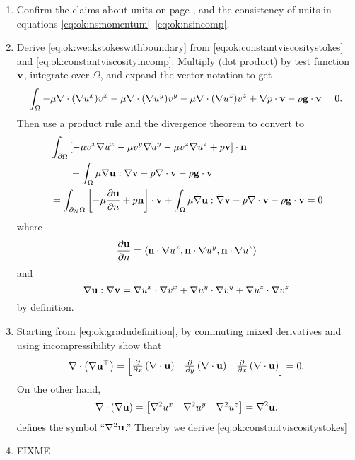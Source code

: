 \renewcommand{\labelenumi}{\arabic{chapter}.\arabic{enumi}\quad}
\begin{enumerate}
\item Confirm the claims about units on page \pageref{page:ok:units}, and the consistency of units in equations \eqref{eq:ok:nsmomentum}--\eqref{eq:ok:nsincomp}.

\item \label{exer:ok:weakderive} Derive \eqref{eq:ok:weakstokeswithboundary} from \eqref{eq:ok:constantviscositystokes} and \eqref{eq:ok:constantviscosityincomp}:  Multiply (dot product) by test function $\mathbf{v}$, integrate over $\Omega$, and expand the vector notation to get
    $$\int_\Omega - \mu \nabla\cdot (\nabla u^x) v^x - \mu \nabla\cdot (\nabla u^y) v^y - \mu \nabla\cdot (\nabla u^z) v^z + \nabla p \cdot \mathbf{v} - \rho \mathbf{g} \cdot \mathbf{v} = 0.$$
Then use a product rule and the divergence theorem to convert to
\begin{align*}
   &\int_{\partial \Omega} \left[- \mu v^x \nabla u^x - \mu v^y \nabla u^y - \mu v^z \nabla u^z + p \mathbf{v}\right] \cdot \mathbf{n} \\
   &\qquad  + \int_\Omega \mu \nabla \mathbf{u} : \nabla \mathbf{v} - p \nabla\cdot \mathbf{v} - \rho \mathbf{g} \cdot \mathbf{v} \\
   &= \int_{\partial_N \Omega} \left[- \mu \frac{\partial \mathbf{u}}{\partial n} + p \mathbf{n} \right] \cdot \mathbf{v} + \int_\Omega \mu \nabla \mathbf{u} : \nabla \mathbf{v} - p \nabla\cdot \mathbf{v} - \rho \mathbf{g} \cdot \mathbf{v} = 0
\end{align*}
where
    $$\frac{\partial \mathbf{u}}{\partial n} = \left<\mathbf{n}\cdot \nabla u^x,\mathbf{n}\cdot \nabla u^y,\mathbf{n}\cdot \nabla u^z\right>$$
and
     $$\nabla \mathbf{u} : \nabla \mathbf{v} = \nabla u^x \cdot \nabla v^x + \nabla u^y \cdot \nabla v^y + \nabla u^z \cdot \nabla v^z$$
by definition.

\item \label{exer:ok:constantviscositystokes}  Starting from \eqref{eq:ok:gradudefinition}, by commuting mixed derivatives and using incompressibility show that
\begin{equation*}
\nabla\cdot \left(\nabla \mathbf{u}^{\top}\right) = \begin{bmatrix}
    \frac{\partial}{\partial x}\left(\nabla\cdot \mathbf{u}\right) & \frac{\partial}{\partial y }\left(\nabla\cdot \mathbf{u}\right) & \frac{\partial}{\partial x} \left(\nabla\cdot \mathbf{u}\right)
    \end{bmatrix}
    = 0.
\end{equation*}
On the other hand,
\begin{equation*}
\nabla\cdot \left(\nabla \mathbf{u}\right) = \begin{bmatrix} \nabla^2 u^x & \nabla^2 u^y & \nabla^2 u^z \end{bmatrix} = \nabla^2 \mathbf{u}.
\end{equation*}
defines the symbol ``$\nabla^2 \mathbf{u}$.''  Thereby we derive \eqref{eq:ok:constantviscositystokes}

\item \label{exer:ok:smalldetails}  FIXME

\end{enumerate}
